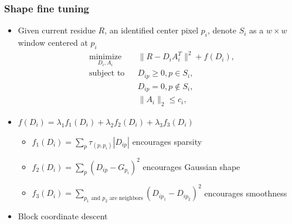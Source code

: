 \documentclass[16pt,presentation]{beamer}
\begin{document}
\begin{frame}
\frametitle{Shape fine tuning}
\begin{itemize}
\item Given current residue $R$, an identified center pixel $p_i$, denote $S_i$ as a $w \times w$ window centered at $p_i$
\[
\begin{aligned}
& \underset{D_i, A_i}{\text{minimize}}
& & \| R - D_i A_i^T \|^2 + f(D_i), \\%
& \text{subject to}
& & D_{ip} \geq 0, p \in S_i,\\
&
& & D_{ip} = 0, p \notin S_i,\\
& 
& & \|A_i\|_2 \leq c_i,
\end{aligned}
\]
\item $f(D_i) = \lambda_1 f_1(D_i) +  \lambda_2 f_2(D_i) +  \lambda_3 f_3(D_i)$
\begin{itemize}
\item $f_1(D_i) = \sum_p \tau_{(p, p_i)} | D_{ip} |$ encourages sparsity
\item $f_2(D_i) = \sum_p (D_{ip} - G_{p_i})^2$ encourages Gaussian shape
\item $f_3(D_i) = \sum_{\text{$p_1$ and $p_2$ are neighbors}} (D_{ip_1} - D_{ip_2})^2$ encourages smoothness
\end{itemize}
\item Block coordinate descent
\end{itemize}
\end{frame}
\end{document}
